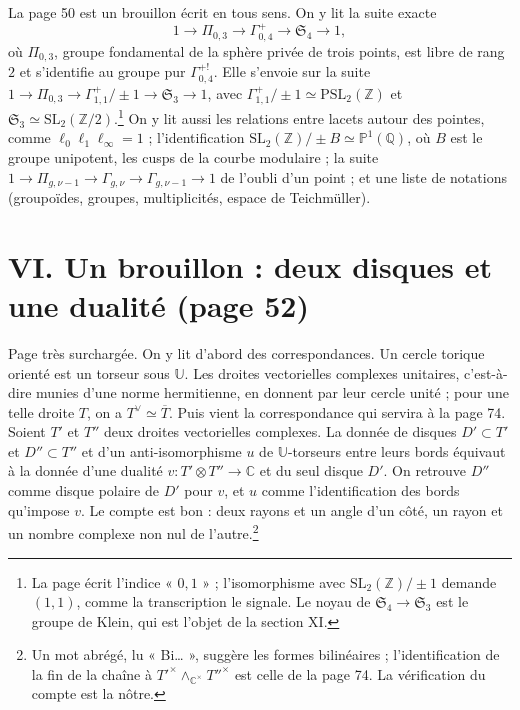\documentclass[11pt,a4paper]{article}
\begin{document}
La page 50 est un brouillon écrit en tous sens. On y lit la suite exacte
\[
1 \to \Pi_{0,3} \to \Gamma^{+}_{0,4} \to \mathfrak{S}_4 \to 1,
\]
où $\Pi_{0,3}$, groupe fondamental de la sphère privée de trois points, est
libre de rang $2$ et s'identifie au groupe pur $\Gamma^{+!}_{0,4}$. Elle
s'envoie sur la suite
$1 \to \Pi_{0,3} \to \Gamma^{+}_{1,1}/\pm 1 \to \mathfrak{S}_3 \to 1$, avec
$\Gamma^{+}_{1,1}/\pm 1 \simeq \mathrm{PSL}_2(\mathbb{Z})$ et $\mathfrak{S}_3
\simeq \mathrm{SL}_2(\mathbb{Z}/2)$.\footnote{La page écrit l'indice
« $0,1$ » ; l'isomorphisme avec $\mathrm{SL}_2(\mathbb{Z})/\pm 1$ demande
$(1,1)$, comme la transcription le signale. Le noyau de
$\mathfrak{S}_4 \to \mathfrak{S}_3$ est le groupe de Klein, qui est l'objet
de la section XI.} On y lit aussi les relations entre lacets autour des
pointes, comme $\ell_0\ell_1\ell_\infty = 1$ ; l'identification
$\mathrm{SL}_2(\mathbb{Z})/\pm B \simeq \mathbb{P}^{1}(\mathbb{Q})$, où $B$
est le groupe unipotent, les cusps de la courbe modulaire ; la suite
$1 \to \Pi_{g,\nu-1} \to \Gamma_{g,\nu} \to \Gamma_{g,\nu-1} \to 1$ de l'oubli
d'un point ; et une liste de notations (groupoïdes, groupes, multiplicités,
espace de Teichmüller).

\section*{VI. Un brouillon : deux disques et une dualité (page 52)}

Page très surchargée. On y lit d'abord des correspondances. Un cercle torique
orienté est un torseur sous $\mathbb{U}$. Les droites vectorielles
complexes unitaires, c'est-à-dire munies d'une norme hermitienne, en donnent
par leur cercle unité ; pour une telle droite $T$, on a $T^{\vee} \simeq
\overline{T}$. Puis vient la correspondance qui servira à la page 74. Soient
$T'$ et $T''$ deux droites vectorielles complexes. La donnée de disques
$D' \subset T'$ et $D'' \subset T''$ et d'un anti-isomorphisme $u$ de
$\mathbb{U}$-torseurs entre leurs bords équivaut à la donnée d'une dualité
$v : T' \otimes T'' \to \mathbb{C}$ et du seul disque $D'$. On retrouve
$D''$ comme disque polaire de $D'$ pour $v$, et $u$ comme l'identification
des bords qu'impose $v$. Le compte est bon : deux rayons et un angle d'un
côté, un rayon et un nombre complexe non nul de l'autre.\footnote{Un mot
abrégé, lu « Bi… », suggère les formes bilinéaires ; l'identification
de la fin de la chaîne à $T'^{\times} \wedge_{\mathbb{C}^{\times}}
T''^{\times}$ est celle de la page 74. La vérification du compte est la
nôtre.}
\end{document}
